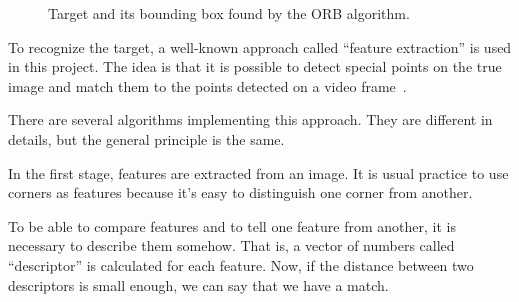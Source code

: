 \documentclass[12pt]{article}
\begin{document}
    \begin{figure}[htbp]
        \noindent\centering
        \hspace{1mm}
        \caption{Target and its bounding box found by the ORB algorithm.}
        \label{fig:target}
    \end{figure}

    To recognize the target, a well-known approach called ``feature
    extraction'' is used in this project.
    The idea is that
    it is possible to detect special points on the true image and match them to the points
    detected on a video frame~\cite{FeaturesExplained}.

    There are several algorithms implementing this approach. They are different
    in details, but the general principle is the same.

    In the first stage, features are extracted from an image. It is usual practice
    to use corners as features because it's easy to distinguish
    one corner from another.

    To be able to compare features and to tell one feature from another,
    it is necessary to describe them somehow. That is, a vector of numbers
    called ``descriptor'' is calculated for each feature. Now, if the distance
    between two descriptors is small enough, we can say that we have a match.
\end{document}
